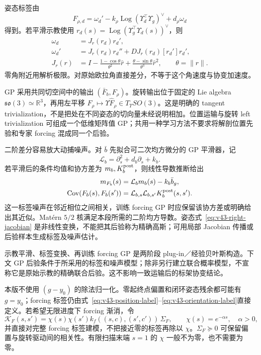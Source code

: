 \documentclass[11pt,a4paper]{article}
\numberwithin{equation}{section}
\theoremstyle{definition}
\newcommand{\R}{\mathbb R}
\begin{document}
姿态标签由
\begin{equation}
 \boxed{F_{\rho,d}=\omega_d'
       -k_\rho\operatorname{Log}(\Upsilon_d^\top\Upsilon_g)^\vee
       +d_\rho\omega_d}
 \label{eq:v43-orientation-label}
\end{equation}
得到。若平滑示教使用 $r_d(s)=\operatorname{Log}(\Upsilon_g^\top\Upsilon_d(s))^\vee$，则
\begin{align}
 \omega_d&=J_r(r_d)r_d',\\
 \omega_d'&=J_r(r_d)r_d''+
              DJ_r(r_d)[r_d']r_d',\\
 J_r(r)&=I-\frac{1-\cos\theta}{\theta^2}\widehat r
              +\frac{\theta-\sin\theta}{\theta^3}\widehat r^2,
       \qquad\theta=\|r\|.
 \label{eq:v43-right-jacobian}
\end{align}
零角附近用解析极限。对原始欧拉角直接差分，不等于这个角速度与协变加速度。

GP 采用共同切空间中的输出 $(\bar F_b,F_\rho)$。旋转输出位于固定的 Lie algebra $\mathfrak{so}(3)\simeq\R^3$，再用左平移 $F_\rho\mapsto\Upsilon\widehat F_\rho\in T_\Upsilon SO(3)$。这是明确的 tangent trivialization，不是把处在不同姿态的切向量未经说明相加。位置运输与旋转 left trivialization 可组成一个低维矩阵值 GP；共用一种学习方法不要求将解剖位置先验和专家 forcing 混成同一个后验。

二阶差分容易放大动捕噪声。对 $\bar b$ 先拟合可二次均方微分的 GP 平滑器，记
\begin{equation}
 \mathcal L_b=\partial_s^2+d_b\partial_s+k_b.
\end{equation}
若平滑后的条件均值和协方差为 $m_b,K_b^{\rm post}$，则线性导数推断给出
\begin{align}
 m_{F_b}(s)&=\mathcal L_bm_b(s)-k_b\bar b_g,\\
 \operatorname{Cov}(F_b(s),F_b(s'))
 &=\mathcal L_{b,s}\mathcal L_{b,s'}K_b^{\rm post}(s,s').
 \label{eq:v43-derivative-noise}
\end{align}
这一标签噪声在邻近相位之间相关，训练 forcing GP 时应保留该协方差或明确给出其近似。Mat\'ern $5/2$ 核满足本段所需的二阶均方导数。姿态式~\eqref{eq:v43-right-jacobian} 是非线性变换，不能把其后验称为精确高斯；可用局部 Jacobian 传播或后验样本生成标签及噪声估计。

示教平滑、标签变换、再训练 forcing GP 是两阶段 plug-in／经验贝叶斯构造。下文 GP 后验条件于所采用的标签和噪声模型；除非另行建立联合概率模型，不宣称它是原始示教的精确联合后验。这不影响一致运输后的标架协变结论。

本版不使用 $(g-y_0)$ 的除法归一化。零起终点偏置和闭环姿态残余都可能有 $g=y_0$；forcing 标签仍由式~\eqref{eq:v43-position-label}--\eqref{eq:v43-orientation-label}直接定义。若希望无限进度下 forcing 渐消，令
\begin{equation}
 \mathcal K_F(s,s')=\chi(s)\chi(s')k_f((s,c),(s',c'))\,\Sigma_F,
 \qquad \chi(s)=e^{-\alpha s},\quad\alpha>0,
 \label{eq:v43-gated-kernel}
\end{equation}
并直接对完整 forcing 标签建模，不把接近零的标签再除以 $\chi$。$\Sigma_F\succeq0$ 可保留偏置与旋转驱动间的相关性。有限扫描末端 $s=1$ 的 $\chi$ 一般不为零，也不需要为零。
\end{document}
